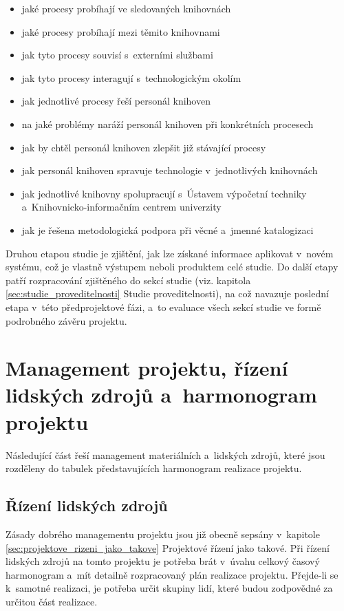 \documentclass[
	11pt, oneside, printed, final, palatino
	microtype,
	table,   %
	lof,     %
	lot     %
]{fithesis3}
\begin{document}
{\begin{itemize}
\item jaké procesy probíhají ve sledovaných knihovnách
\item jaké procesy probíhají mezi těmito knihovnami
\item jak tyto procesy souvisí s~externími službami
\item jak tyto procesy interagují s~technologickým okolím
\item jak jednotlivé procesy řeší personál knihoven
\item na jaké problémy naráží personál knihoven při konkrétních procesech
\item jak by chtěl personál knihoven zlepšit již stávající procesy
\item jak personál knihoven spravuje technologie v~jednotlivých knihovnách
\item jak jednotlivé knihovny spolupracují s~Ústavem výpočetní techniky a~Knihovnicko-informačním centrem univerzity
\item jak je řešena metodologická podpora při věcné a~jmenné katalogizaci
\end{itemize}

Druhou etapou studie je zjištění, jak lze získané informace aplikovat v~novém systému, což je vlastně výstupem neboli produktem celé studie. Do další etapy patří rozpracování zjištěného do sekcí studie (viz. kapitola \ref{sec:studie_proveditelnosti} Studie proveditelnosti), na což navazuje poslední etapa v~této předprojektové fázi, a~to evaluace všech sekcí studie ve formě podrobného závěru projektu.

\section{Management projektu, řízení lidských zdrojů a~harmonogram projektu}

Následující část řeší management materiálních a~lidských zdrojů, které jsou rozděleny do tabulek představujících harmonogram realizace projektu.

\subsection{Řízení lidských zdrojů}

Zásady dobrého managementu projektu jsou již obecně sepsány v~kapitole \ref{sec:projektove_rizeni_jako_takove} Projektové řízení jako takové. Při řízení lidských zdrojů na tomto projektu je potřeba brát v~úvahu celkový časový harmonogram a~mít detailně rozpracovaný plán realizace projektu. Přejde-li se k~samotné realizaci, je potřeba určit skupiny lidí, které budou zodpovědné za určitou část realizace.

}
\end{document}
